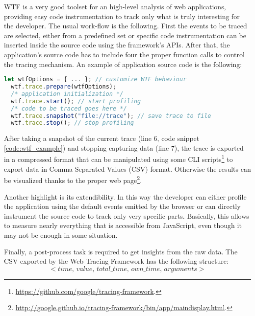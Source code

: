 WTF is a very good toolset for an high-level analysis of web applications,
providing easy code instrumentation to track only what is truly interesting for the developer.
The usual work-flow is the following. First the events to be traced 
are selected, either from a predefined set or specific code instrumentation can be
inserted inside the source code using the framework's APIs. After that, the application's source code
has to include four the proper function calls to control the tracing mechanism.
An example of application source code is the following:
\begin{lstlisting}[caption=Usage example of the Web Tracing Framework., language=JavaScript,
  label=code:wtf_example]
  let wtfOptions = { ... }; // customize WTF behaviour
  wtf.trace.prepare(wtfOptions);
  /* application initialization */
  wtf.trace.start(); // start profiling
  /* code to be traced goes here */
  wtf.trace.snapshot("file://trace"); // save trace to file
  wtf.trace.stop(); // stop profiling
\end{lstlisting}

After taking a snapshot of the current trace (line 6, code snippet \ref{code:wtf_example})
and stopping capturing data (line 7), the trace is exported in a
compressed format that can be manipulated using some CLI
scripts\footnote{\url{https://github.com/google/tracing-framework}.} to export
data in Comma Separated Values (CSV) format. Otherwise the results can be visualized
thanks to the proper web
page\footnote{\url{http://google.github.io/tracing-framework/bin/app/maindisplay.html}.}.

Another highlight is its extendibility. In this way the developer can either
profile the application using the default events emitted by the browser or can 
directly instrument the source code to track only very specific parts. Basically, this
allows to measure nearly everything that is accessible from JavaScript, even
though it may not be enough in some situation.

Finally, a post-process task is required to get insights from the raw data.
The CSV exported by the Web Tracing Framework has the following structure:
\begin{equation*}
    <time,\,value,\,total\_time,\,own\_time,\,arguments>
\end{equation*}

